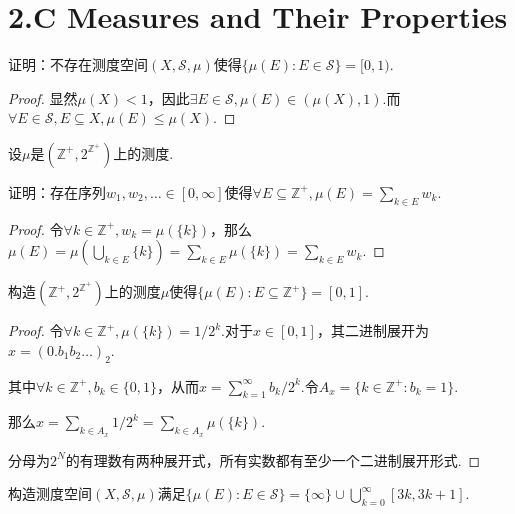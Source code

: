 \section{2.C Measures and Their Properties}

\begin{problem}[1]\label{2.C.1}
    证明：不存在测度空间\((X, \mathcal{S}, \mu)\)使得\(\{\mu(E): E \in \mathcal{S}\}=[0,1)\).
\end{problem}

\begin{proof}
    显然\(\mu(X)<1\)，因此\(\exists E \in \mathcal{S}, \mu(E) \in (\mu(X), 1)\).而\(\forall E \in \mathcal{S}, E \subseteq X, \mu(E) \leq \mu(X)\).
\end{proof}

\begin{problem}[2]\label{2.C.2}
    设\(\mu\)是\((\mathbb{Z}^+, 2^{\mathbb{Z}^+})\)上的测度.

    证明：存在序列\(w_1, w_2, \dots \in [0,\infty]\)使得\(\forall E \subseteq \mathbb{Z}^+, \mu(E)=\sum_{k \in E} w_k\).
\end{problem}

\begin{proof}
    令\(\forall k \in \mathbb{Z}^+, w_k=\mu(\{k\})\)，那么\(\mu(E)=\mu(\bigcup_{k \in E} \{k\})=\sum_{k \in E} \mu(\{k\})=\sum_{k \in E} w_k\).
\end{proof}

\begin{problem}[3]\label{2.C.3}
    构造\((\mathbb{Z}^+, 2^{\mathbb{Z}^+})\)上的测度\(\mu\)使得\(\{\mu(E): E \subseteq \mathbb{Z}^+\}=[0,1]\).
\end{problem}

\begin{proof}
    令\(\forall k \in \mathbb{Z}^+, \mu(\{k\})=1/2^k\).对于\(x \in [0,1]\)，其{\kaishu 二进制展开}为\(x=(0.b_1 b_2 \dots)_2\).

    其中\(\forall k \in \mathbb{Z}^+, b_k \in \{0,1\}\)，从而\(x=\sum_{k=1}^\infty b_k/2^k\).令\(A_x=\{k \in \mathbb{Z}^+: b_k=1\}\).
    
    那么\(x=\sum_{k \in A_x} 1/2^k=\sum_{k \in A_x} \mu(\{k\})\).

    {\kaishu 分母为\(2^N\)的有理数有两种展开式，所有实数都有至少一个二进制展开形式.}
\end{proof}

\begin{problem}[4]\label{2.C.4}
    构造测度空间\((X, \mathcal{S}, \mu)\)满足\(\{\mu(E): E \in \mathcal{S}\}=\{\infty\} \cup \bigcup_{k=0}^\infty [3k,3k+1]\).
\end{problem}

